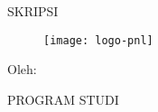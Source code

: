 \begin{titlepage}
\begin{center}

\MakeUppercase{skripsi}

\vfill
\begin{figure}[h]
\centering
\texttt{[image: logo-pnl]}
\end{figure}

\vfill
\MakeUppercase{\judulId}

\vfill
Oleh:
\MakeUppercase{\mahasiswa}
\nim

\vfill
\MakeUppercase{
program studi \prodi \\
\jurusan \\
\institusi \\
\the\year{}
}

\end{center}
\end{titlepage}